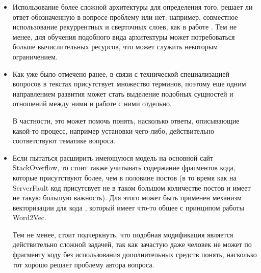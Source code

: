\documentclass[../diploma.tex]{subfiles}
\begin{document}
	\begin{itemize}
		\item
		Использование более сложной архитектуры для определения того, решает ли ответ обозначенную в вопросе проблему или нет: например, 
		совместное использование рекуррентных и сверточных слоев, как в работе \cite{article:text_rnn_cnn}. 
		Тем не менее, для обучения подобного вида архитектуры может потребоваться больше вычислительных ресурсов, что может служить некоторым ограничением.

		\item
		Как уже было отмечено ранее, в связи с технической специализацией вопросов в текстах присутствует множество терминов, 
		поэтому еще одним направлением развития может стать выделение подобных сущностей и отношений между ними \cite{article:entity_recognition} и работе с ними отдельно.

		В частности, это может помочь понять, насколько ответы, описывающие какой-то процесс, например установки чего-либо, действительно соответствуют тематике вопроса.

		\item
		Если пытаться расширить имеющуюся модель на основной сайт StackOverflow, то стоит также учитывать содержание фрагментов кода, 
		которые присутствуют более, чем в половине постов 
		(в то время как на ServerFault код присутсвует не в таком большом количестве постов и имеет не такую большую важность).
		Для этого может быть применен механизм векторизации для кода \cite{article:code_embedding}, который имеет что-то общее с принципом работы Word2Vec.

		Тем не менее, стоит подчеркнуть, что подобная модификация является действительно сложной задачей, 
		так как зачастую даже человек не может по фрагменту коду без использования дополнительных средств понять, насколько тот хорошо решает проблему автора вопроса.

	\end{itemize}
	
\end{document}
